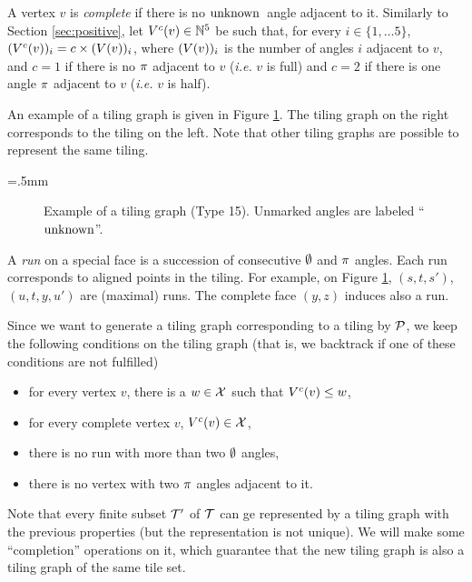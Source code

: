 \documentclass[11pt]{article}
\theoremstyle{definition}
\begin{document}
A vertex $v$ is \emph{complete} if there is no $\aunk$~angle adjacent to it.
Similarly to Section \ref{sec:positive}, let $\cvect(v)\in \mathbb{N}^5$ be such that, for every $i\in\{1,\ldots 5\}$, $(\cvect(v))_i=c\times (\vect(v))_i$, where $(\vect(v))_i$ is the number of angles $i$ adjacent to $v$, and $c=1$ if there is no $\api$ adjacent to $v$ (\emph{i.e.} $v$ is full) and $c=2$ if there is one angle $\api$ adjacent to $v$ (\emph{i.e.} $v$ is half).

An example of a tiling graph is given in Figure \ref{fig:tgraph}. The tiling graph on the right corresponds to the tiling on the left. Note that other tiling graphs are possible to represent the same tiling.

\newdimen\nodeDist
\nodeDist=.5mm

\begin{figure}
\begin{minipage}{.3\linewidth}
\begin{tikzpicture}[scale=1., rotate=45]

\end{tikzpicture}
\end{minipage}
\begin{minipage}{.7\linewidth}
\begin{tikzpicture}[scale=2.5,every node/.style={circle,inner sep=0pt,text width=4mm,align=center}, rotate=45]

\end{tikzpicture}
\end{minipage}
\caption{Example of a tiling graph (Type 15). Unmarked angles are labeled ``$\aunk$''.}
\label{fig:tgraph}
\end{figure}

A \emph{run} on a special face is a succession of consecutive $\azero$ and $\api$ angles. Each run corresponds to aligned points in the tiling.
For example, on Figure \ref{fig:tgraph}, $(s,t,s')$, $(u,t,y,u')$ are (maximal) runs. The complete face $(y,z)$ induces also a run.


Since we want to generate a tiling graph corresponding to a tiling by $\penta$, we keep the following conditions on the tiling graph (that is, we backtrack if one of these conditions are not fulfilled)
\begin{itemize}
  \item for every vertex $v$, there is a $w\in \mX$ such that $\cvect(v)\le w$,
  \item for every complete vertex $v$, $\cvect(v) \in \mX$,
  \item there is no run with more than two $\azero$ angles,
  \item there is no vertex with two $\api$ angles adjacent to it.
\end{itemize}
%
%
%
%
Note that every finite subset $\tiling'$ of $\tiling$ can ge represented by a tiling graph with the previous properties (but the representation is not unique).
We will make some ``completion'' operations on it, which guarantee that the new tiling graph is also a tiling graph of the same tile set.
\end{document}
